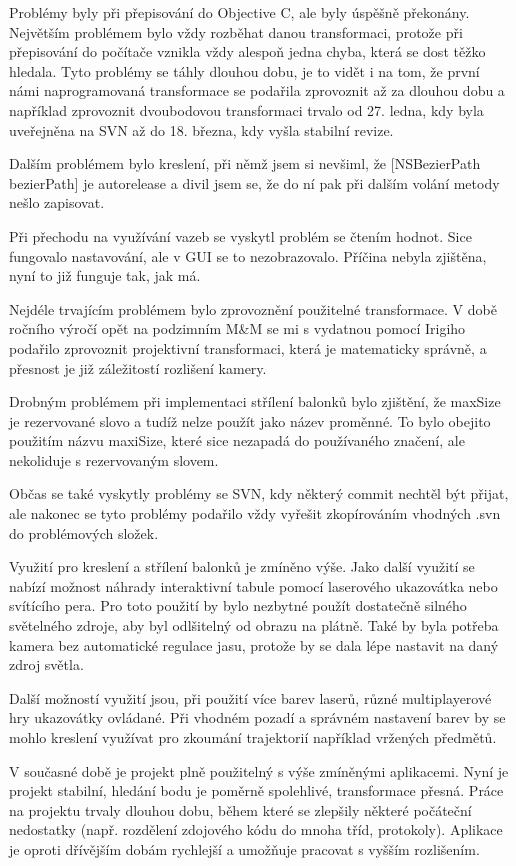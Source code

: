 \documentclass[twoside,12pt]{article}
\begin{document}
Problémy byly při přepisování do Objective C, ale byly úspěšně překonány. Největším problémem bylo vždy rozběhat danou transformaci, protože při přepisování do počítače vznikla vždy alespoň jedna chyba, která se dost těžko hledala. Tyto problémy se táhly dlouhou dobu, je to vidět i na tom, že první námi naprogramovaná transformace se podařila zprovoznit až za dlouhou dobu a například zprovoznit dvoubodovou transformaci trvalo od 27. ledna, kdy byla uveřejněna na SVN až do 18. března, kdy vyšla stabilní revize.

Dalším problémem bylo kreslení, při němž jsem si nevšiml, že [NSBezierPath bezierPath] je autorelease a divil jsem se, že do ní pak při dalším volání metody nešlo zapisovat.

Při přechodu na využívání vazeb se vyskytl problém se čtením hodnot. Sice fungovalo nastavování, ale v GUI se to nezobrazovalo. Příčina nebyla zjištěna, nyní to již funguje tak, jak má.

Nejdéle trvajícím problémem bylo zprovoznění použitelné transformace. V době ročního výročí opět na podzimním M\&M se mi s vydatnou pomocí Irigiho podařilo zprovoznit projektivní transformaci, která je matematicky správně, a přesnost je již záležitostí rozlišení kamery. 

Drobným problémem při implementaci střílení balonků bylo zjištění, že maxSize je rezervované slovo a tudíž nelze použít jako název proměnné. To bylo obejito použitím názvu maxiSize, které sice nezapadá do používaného značení, ale nekoliduje s rezervovaným slovem.

Občas se také vyskytly problémy se SVN, kdy některý commit nechtěl být přijat, ale nakonec se tyto problémy podařilo vždy vyřešit zkopírováním vhodných .svn do problémových složek.

Využití pro kreslení a střílení balonků je zmíněno výše. Jako další využití se nabízí možnost náhrady interaktivní tabule pomocí laserového ukazovátka nebo svítícího pera. Pro toto použití by bylo nezbytné použít dostatečně silného světelného zdroje, aby byl odlšitelný od obrazu na plátně. Také by byla potřeba kamera bez automatické regulace jasu, protože by se dala lépe nastavit na daný zdroj světla. 

Další možností využití jsou, při použití více barev laserů, různé multiplayerové hry ukazovátky ovládané. Při vhodném pozadí a správném nastavení barev by se mohlo kreslení využívat pro zkoumání trajektorií například vržených předmětů.

V současné době je projekt plně použitelný s výše zmíněnými aplikacemi. Nyní je projekt stabilní, hledání bodu je poměrně spolehlivé, transformace přesná. Práce na projektu trvaly dlouhou dobu, během které se zlepšily některé počáteční nedostatky (např. rozdělení zdojového kódu do mnoha tříd, protokoly). Aplikace je oproti dřívějším dobám rychlejší a umožňuje pracovat s vyšším rozlišením. 
\end{document}
